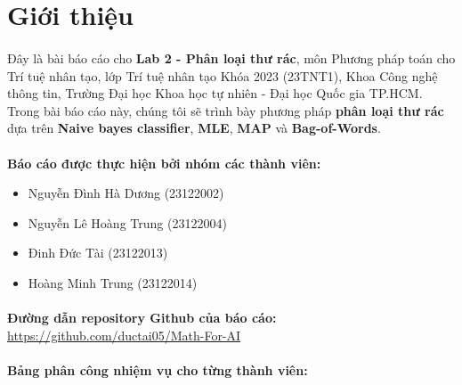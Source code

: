 \newpage
\section{Giới thiệu}

\paragraph{}{Đây là bài báo cáo cho \textbf{Lab 2 - Phân loại thư rác}, môn Phương pháp toán cho Trí tuệ nhân tạo, lớp Trí tuệ nhân tạo Khóa 2023 (23TNT1), Khoa Công nghệ thông tin, Trường Đại học Khoa học tự nhiên - Đại học Quốc gia TP.HCM. \\

Trong bài báo cáo này, chúng tôi sẽ trình bày phương pháp \textbf{phân loại thư rác} dựa trên \textbf{Naive bayes
classifier}, \textbf{MLE}, \textbf{MAP} và \textbf{Bag-of-Words}.}

\paragraph{}{\textbf{Báo cáo được thực hiện bởi nhóm các thành viên:}} 
\begin{itemize}
    \item Nguyễn Đình Hà Dương (23122002)
    \item Nguyễn Lê Hoàng Trung (23122004)
    \item Đinh Đức Tài (23122013)
    \item Hoàng Minh Trung (23122014)
\end{itemize}

\paragraph{}{\textbf{Đường dẫn repository Github của báo cáo:}} \href{https://github.com/ductai05/Math-For-AI}{https://github.com/ductai05/Math-For-AI} \cite{repo}

\paragraph{}{\textbf{Bảng phân công nhiệm vụ cho từng thành viên:}}

